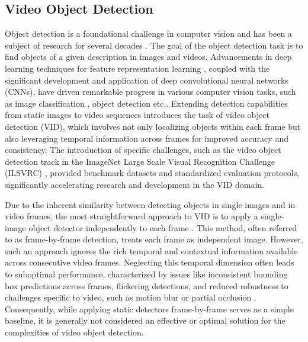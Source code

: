 \subsection{Video Object Detection} \label{Background:VideoObjectDetection}


Object detection is a foundational challenge in computer vision and has been a subject of research for several decades \cite{fischlerRepresentationMatchingPictorial1973}. The goal of the object detection task is to find objects of a given description in images and videos.
Advancements in deep learning techniques for feature representation learning \cite{hintonReducingDimensionalityData2006, lecunDeepLearning2015}, coupled with the significant development and application of deep convolutional neural networks (CNNs), have driven remarkable progress in various computer vision tasks, such as image classification \cite{krizhevskyImageNetClassificationDeep2012}, object detection \cite{girshickRichFeatureHierarchies2014a} etc..
Extending detection capabilities from static images to video sequences introduces the task of video object detection (VID), which involves not only localizing objects within each frame but also leveraging temporal information across frames for improved accuracy and consistency.
The introduction of specific challenges, such as the video object detection track in the ImageNet Large Scale Visual Recognition Challenge (ILSVRC) \cite{russakovskyImageNetLargeScale2015}, provided benchmark datasets and standardized evaluation protocols, significantly accelerating research and development in the VID domain.

Due to the inherent similarity between detecting objects in single images and in video frames, the most straightforward approach to VID is to apply a single-image object detector independently to each frame \cite{placeholder_static_detector_for_vid}. This method, often referred to as frame-by-frame detection, treats each frame as independent image. However, such an approach ignores the rich temporal and contextual information available across consecutive video frames. Neglecting this temporal dimension often leads to suboptimal performance, characterized by issues like inconsistent bounding box predictions across frames, flickering detections, and reduced robustness to challenges specific to video, such as motion blur or partial occlusion \cite{placeholder_vid_limitations_survey}. Consequently, while applying static detectors frame-by-frame serves as a simple baseline, it is generally not considered an effective or optimal solution for the complexities of video object detection.

